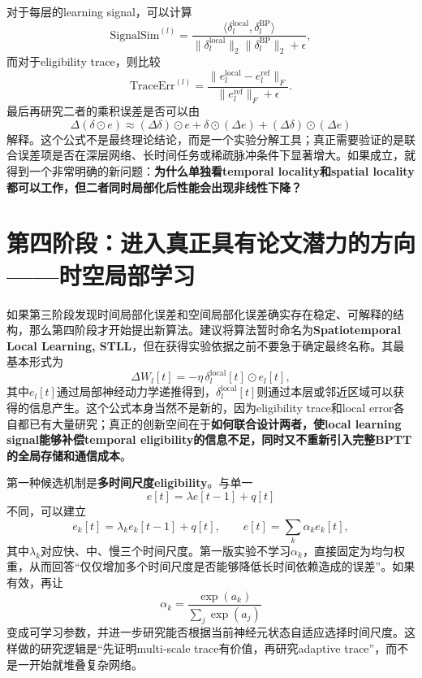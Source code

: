 \documentclass[journal,12pt,onecolumn]{IEEEtran}
\begin{document}
对于每层的learning signal，可以计算
\begin{equation}
\mathrm{SignalSim}^{(l)}
=
\frac{
\langle \delta_l^{\mathrm{local}},\delta_l^{\mathrm{BP}}\rangle
}{
\|\delta_l^{\mathrm{local}}\|_2
\|\delta_l^{\mathrm{BP}}\|_2+\epsilon
},
\end{equation}
而对于eligibility trace，则比较
\begin{equation}
\mathrm{TraceErr}^{(l)}
=
\frac{
\|e_l^{\mathrm{local}}-e_l^{\mathrm{ref}}\|_F
}{
\|e_l^{\mathrm{ref}}\|_F+\epsilon
}.
\end{equation}
最后再研究二者的乘积误差是否可以由
\begin{equation}
\Delta(\delta\odot e)
\approx
(\Delta\delta)\odot e
+
\delta\odot(\Delta e)
+
(\Delta\delta)\odot(\Delta e)
\end{equation}
解释。这个公式不是最终理论结论，而是一个实验分解工具；真正需要验证的是联合误差项是否在深层网络、长时间任务或稀疏脉冲条件下显著增大。如果成立，就得到一个非常明确的新问题：\textbf{为什么单独看temporal locality和spatial locality都可以工作，但二者同时局部化后性能会出现非线性下降？}

\section{第四阶段：进入真正具有论文潜力的方向——时空局部学习}

如果第三阶段发现时间局部化误差和空间局部化误差确实存在稳定、可解释的结构，那么第四阶段才开始提出新算法。建议将算法暂时命名为\textbf{Spatiotemporal Local Learning, STLL}，但在获得实验依据之前不要急于确定最终名称。其最基本形式为
\begin{equation}
\Delta W_l[t]
=
-\eta\,
\delta_l^{\mathrm{local}}[t]
\odot
e_l[t],
\end{equation}
其中$e_l[t]$通过局部神经动力学递推得到，$\delta_l^{\mathrm{local}}[t]$则通过本层或邻近区域可以获得的信息产生。这个公式本身当然不是新的，因为eligibility trace和local error各自都已有大量研究；真正的创新空间在于\textbf{如何联合设计两者，使local learning signal能够补偿temporal eligibility的信息不足，同时又不重新引入完整BPTT的全局存储和通信成本}。

第一种候选机制是\textbf{多时间尺度eligibility}。与单一
\begin{equation}
e[t]=\lambda e[t-1]+q[t]
\end{equation}
不同，可以建立
\begin{equation}
e_k[t]=\lambda_k e_k[t-1]+q[t],
\qquad
e[t]=\sum_k\alpha_k e_k[t],
\end{equation}
其中$\lambda_k$对应快、中、慢三个时间尺度。第一版实验不学习$\alpha_k$，直接固定为均匀权重，从而回答“仅仅增加多个时间尺度是否能够降低长时间依赖造成的误差”。如果有效，再让
\begin{equation}
\alpha_k=\frac{\exp(a_k)}{\sum_j\exp(a_j)}
\end{equation}
变成可学习参数，并进一步研究能否根据当前神经元状态自适应选择时间尺度。这样做的研究逻辑是“先证明multi-scale trace有价值，再研究adaptive trace”，而不是一开始就堆叠复杂网络。
\end{document}
